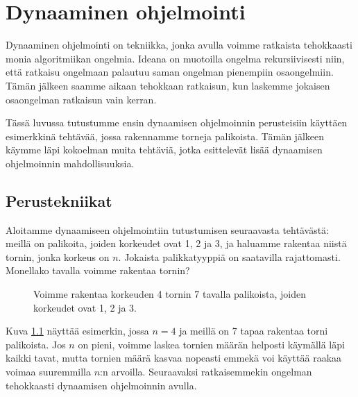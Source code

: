 \chapter{Dynaaminen ohjelmointi}

Dynaaminen ohjelmointi on tekniikka,
jonka avulla voimme ratkaista tehokkaasti monia
algoritmiikan ongelmia.
Ideana on muotoilla ongelma rekursiivisesti niin,
että ratkaisu ongelmaan palautuu saman ongelman
pienempiin osaongelmiin.
Tämän jälkeen saamme aikaan tehokkaan ratkaisun,
kun laskemme jokaisen osaongelman ratkaisun vain kerran.

Tässä luvussa tutustumme ensin dynaamisen ohjelmoinnin perusteisiin
käyttäen esimerkkinä tehtävää, jossa rakennamme torneja palikoista.
Tämän jälkeen käymme läpi kokoelman muita tehtäviä, jotka esittelevät
lisää dynaamisen ohjelmoinnin mahdollisuuksia.

\section{Perustekniikat}

Aloitamme dynaamiseen ohjelmointiin tutustumisen
seuraavasta tehtävästä:
meillä on palikoita, joiden korkeudet ovat 1, 2 ja 3,
ja haluamme rakentaa niistä tornin, jonka korkeus on $n$.
Jokaista palikkatyyppiä on saatavilla rajattomasti.
Monellako tavalla voimme rakentaa tornin?

\begin{figure}
\center
{}
\caption{Voimme rakentaa korkeuden 4 tornin 7 tavalla palikoista,
joiden korkeudet ovat 1, 2 ja 3.}
\label{fig:dyntor}
\end{figure}

Kuva \ref{fig:dyntor} näyttää esimerkin, jossa $n=4$
ja meillä on 7 tapaa rakentaa torni palikoista.
Jos $n$ on pieni, voimme laskea tornien määrän helposti
käymällä läpi kaikki tavat, mutta tornien määrä kasvaa
nopeasti emmekä voi käyttää raakaa voimaa suuremmilla
$n$:n arvoilla.
Seuraavaksi ratkaisemmekin ongelman tehokkaasti
dynaamisen ohjelmoinnin avulla.

